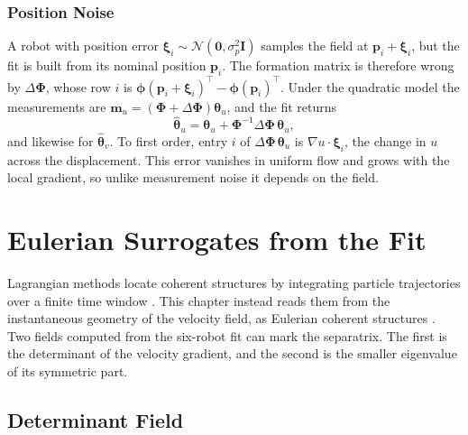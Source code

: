 \subsubsection{Position Noise}
A robot with position error
$\boldsymbol{\xi}_i \sim \mathcal{N}(\mathbf{0}, \sigma_p^2\mathbf{I})$
samples the field at $\mathbf{p}_i + \boldsymbol{\xi}_i$, but the fit is
built from its nominal position $\mathbf{p}_i$. The formation matrix is
therefore wrong by $\Delta\boldsymbol{\Phi}$, whose row $i$ is
$\boldsymbol{\phi}(\mathbf{p}_i + \boldsymbol{\xi}_i)^{\top} -
\boldsymbol{\phi}(\mathbf{p}_i)^{\top}$. Under the quadratic model the
measurements are
$\mathbf{m}_u = (\boldsymbol{\Phi} + \Delta\boldsymbol{\Phi})
\boldsymbol{\theta}_u$, and the fit returns
\begin{equation}
    \hat{\boldsymbol{\theta}}_u = \boldsymbol{\theta}_u
        + \boldsymbol{\Phi}^{-1}\Delta\boldsymbol{\Phi}\,
          \boldsymbol{\theta}_u ,
    \label{eq:ch7:pos_noise}
\end{equation}
and likewise for $\hat{\boldsymbol{\theta}}_v$. To first order, entry
$i$ of $\Delta\boldsymbol{\Phi}\,\boldsymbol{\theta}_u$ is
$\nabla u \cdot \boldsymbol{\xi}_i$, the change in $u$ across the
displacement. This error vanishes in uniform flow and grows with the
local gradient, so unlike measurement noise it depends on the field.

\section{Eulerian Surrogates from the Fit}
\label{sec:ch7:surrogates}

Lagrangian methods locate coherent structures by integrating particle
trajectories over a finite time window \cite{57,52}. This chapter instead
reads them from the instantaneous geometry of the velocity field, as
Eulerian coherent structures \cite{49}. Two fields computed from the
six-robot fit can mark the separatrix. The first is the determinant of the velocity
gradient, and the second is the smaller eigenvalue of its symmetric
part.

\subsection{Determinant Field}
\label{sec:ch7:det_field}

